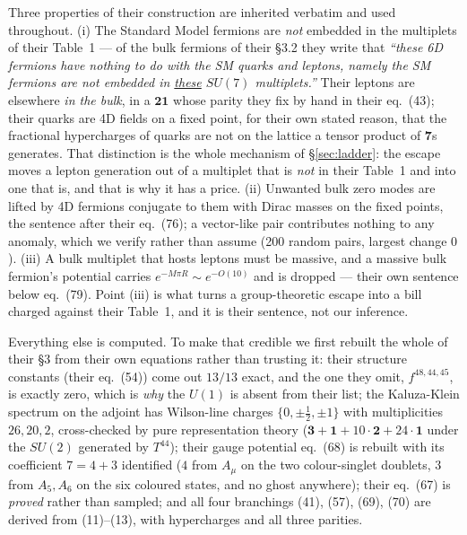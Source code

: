 \documentclass[11pt,a4paper]{article}
\newcommand{\su}[1]{SU(#1)}
\newcommand{\rep}[1]{\mathbf{#1}}
\begin{document}
Three properties of their construction are inherited verbatim and used throughout. (i) The Standard
Model fermions are \emph{not} embedded in the multiplets of their Table~1 --- of the bulk fermions of
their \S3.2 they write that \emph{``these 6D fermions have nothing to do with the SM quarks and
leptons, namely the SM fermions are not embedded in \underline{these} $\su7$ multiplets.''} Their
leptons are elsewhere \emph{in the bulk}, in a $\rep{21}$ whose parity they fix by hand in their
eq.~(43); their quarks are 4D fields on a fixed point, for their own stated reason, that the
fractional hypercharges of quarks are not on the lattice a tensor product of $\rep7$s generates. That
distinction is the whole mechanism of \S\ref{sec:ladder}: the escape moves a lepton generation out of
a multiplet that is \emph{not} in their Table~1 and into one that is, and that is why it has a price.
(ii) Unwanted bulk zero modes are lifted by 4D fermions conjugate to them with Dirac masses on the
fixed points, the sentence after their eq.~(76); a vector-like pair contributes nothing to any
anomaly, which we verify rather than assume (200 random pairs, largest change $0$). (iii) A bulk
multiplet that hosts leptons must be massive, and a massive bulk fermion's potential carries
$e^{-M\pi R}\sim e^{-O(10)}$ and is dropped --- their own sentence below eq.~(79). Point (iii) is
what turns a group-theoretic escape into a bill charged against their Table~1, and it is their
sentence, not our inference.

Everything else is computed. To make that credible we first rebuilt the whole of their \S3 from
their own equations rather than trusting it: their structure constants (their eq.~(54)) come out
$13/13$ exact, and the one they omit, $f^{48,44,45}$, is exactly zero, which is \emph{why} the
$U(1)$ is absent from their list; the Kaluza-Klein spectrum on the adjoint has Wilson-line charges
$\{0,\pm\tfrac12,\pm1\}$ with multiplicities $26,20,2$, cross-checked by pure representation theory
($\rep3+\rep1+10\cdot\rep2+24\cdot\rep1$ under the $\su2$ generated by $T^{44}$); their gauge
potential eq.~(68) is rebuilt with its coefficient $7=4+3$ identified ($4$ from $A_\mu$ on the two
colour-singlet doublets, $3$ from $A_5,A_6$ on the six coloured states, and no ghost anywhere);
their eq.~(67) is \emph{proved} rather than sampled; and all four branchings (41), (57), (69), (70)
are derived from (11)--(13), with hypercharges and all three parities.
\end{document}
